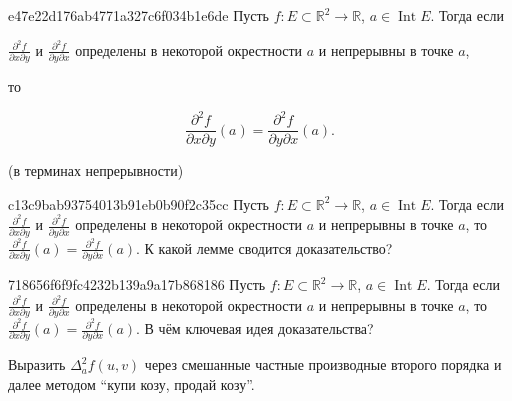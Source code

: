 \begin{note}{e47e22d176ab4771a327c6f034b1e6de}
    Пусть \({ f : E \subset \mathbb R^2 \to \mathbb R }\),\: \({ a \in \operatorname{Int} E }\).
    Тогда если \begin{icloze}{1}\({ \frac{\partial^2  f}{\partial x \partial y} }\) и \({ \frac{\partial^2 f}{\partial y \partial x} }\) определены в некоторой окрестности \({ a }\) и непрерывны в точке \({ a }\),\end{icloze}
    то
    \begin{icloze}{2}
        \[
            \frac{\partial^2 f}{\partial x \partial y}(a) = \frac{\partial^2 f}{\partial y \partial x}(a).
        \]
    \end{icloze}

    \begin{center}
        \tiny
        (в терминах непрерывности)
    \end{center}
\end{note}

\begin{note}{c13c9bab93754013b91eb0b90f2c35cc}
    Пусть \({ f : E \subset \mathbb R^2 \to \mathbb R }\),\: \({ a \in \operatorname{Int} E }\).
    Тогда если \({ \frac{\partial^2  f}{\partial x \partial y} }\) и \({ \frac{\partial^2 f}{\partial y \partial x} }\) определены в некоторой окрестности \({ a }\) и непрерывны в точке \({ a }\),
    то \({ \frac{\partial^2 f}{\partial x \partial y}(a) = \frac{\partial^2 f}{\partial y \partial x}(a) }\).
    К какой лемме сводится доказательство?
\end{note}

\begin{note}{718656f6f9fc4232b139a9a17b868186}
    Пусть \({ f : E \subset \mathbb R^2 \to \mathbb R }\),\: \({ a \in \operatorname{Int} E }\).
    Тогда если \({ \frac{\partial^2  f}{\partial x \partial y} }\) и \({ \frac{\partial^2 f}{\partial y \partial x} }\) определены в некоторой окрестности \({ a }\) и непрерывны в точке \({ a }\),
    то \({ \frac{\partial^2 f}{\partial x \partial y}(a) = \frac{\partial^2 f}{\partial y \partial x}(a) }\).
    В чём ключевая идея доказательства?

    \begin{cloze}{1}
        Выразить \({ \Delta_{a}^2 f(u, v) }\) через смешанные частные производные второго порядка и далее методом ``купи козу, продай козу''.
    \end{cloze}
\end{note}

